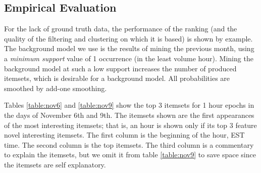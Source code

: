 \documentclass{sig-alternate}
\begin{document}
\subsection{Empirical Evaluation}
\label{sec:empirical}
For the lack of ground truth data, the performance of the ranking (and the quality of the filtering and clustering on which it is based) is shown by example. The background model we use is the results of mining the previous month, using a \emph{minimum support} value of 1 occurrence (in the least volume hour). Mining the background model at such a low support increases the number of produced itemsets, which is desirable for a background model. All probabilities are smoothed by add-one smoothing. 

Tables \ref{table:nov6} and \ref{table:nov9}  show the top 3 itemsets for 1 hour epochs in the days of November 6th and 9th. The itemsets shown are the first appearances of the most interesting itemsets; that is, an hour is shown only if its top 3 feature novel interesting itemsets. The first column is the beginning of the hour, EST time. The second column is the top itemsets. The third column is a commentary to explain the itemsets, but we omit it from table \ref{table:nov9} to save space since the itemsets are self explanatory.
\end{document}
